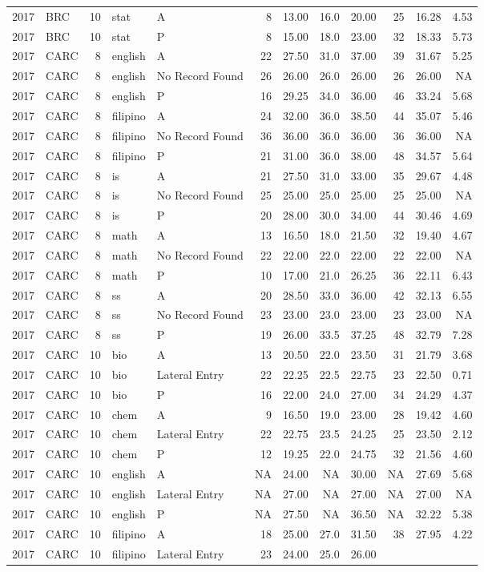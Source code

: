 \documentclass[]{article}
\begin{document}
\begin{longtable}[]{@{}rlrllrrrrrrr@{}}
2017 & BRC & 10 & stat & A & 8 & 13.00 & 16.0 & 20.00 & 25 & 16.28 &
4.53\tabularnewline
2017 & BRC & 10 & stat & P & 8 & 15.00 & 18.0 & 23.00 & 32 & 18.33 &
5.73\tabularnewline
2017 & CARC & 8 & english & A & 22 & 27.50 & 31.0 & 37.00 & 39 & 31.67 &
5.25\tabularnewline
2017 & CARC & 8 & english & No Record Found & 26 & 26.00 & 26.0 & 26.00
& 26 & 26.00 & NA\tabularnewline
2017 & CARC & 8 & english & P & 16 & 29.25 & 34.0 & 36.00 & 46 & 33.24 &
5.68\tabularnewline
2017 & CARC & 8 & filipino & A & 24 & 32.00 & 36.0 & 38.50 & 44 & 35.07
& 5.46\tabularnewline
2017 & CARC & 8 & filipino & No Record Found & 36 & 36.00 & 36.0 & 36.00
& 36 & 36.00 & NA\tabularnewline
2017 & CARC & 8 & filipino & P & 21 & 31.00 & 36.0 & 38.00 & 48 & 34.57
& 5.64\tabularnewline
2017 & CARC & 8 & is & A & 21 & 27.50 & 31.0 & 33.00 & 35 & 29.67 &
4.48\tabularnewline
2017 & CARC & 8 & is & No Record Found & 25 & 25.00 & 25.0 & 25.00 & 25
& 25.00 & NA\tabularnewline
2017 & CARC & 8 & is & P & 20 & 28.00 & 30.0 & 34.00 & 44 & 30.46 &
4.69\tabularnewline
2017 & CARC & 8 & math & A & 13 & 16.50 & 18.0 & 21.50 & 32 & 19.40 &
4.67\tabularnewline
2017 & CARC & 8 & math & No Record Found & 22 & 22.00 & 22.0 & 22.00 &
22 & 22.00 & NA\tabularnewline
2017 & CARC & 8 & math & P & 10 & 17.00 & 21.0 & 26.25 & 36 & 22.11 &
6.43\tabularnewline
2017 & CARC & 8 & ss & A & 20 & 28.50 & 33.0 & 36.00 & 42 & 32.13 &
6.55\tabularnewline
2017 & CARC & 8 & ss & No Record Found & 23 & 23.00 & 23.0 & 23.00 & 23
& 23.00 & NA\tabularnewline
2017 & CARC & 8 & ss & P & 19 & 26.00 & 33.5 & 37.25 & 48 & 32.79 &
7.28\tabularnewline
2017 & CARC & 10 & bio & A & 13 & 20.50 & 22.0 & 23.50 & 31 & 21.79 &
3.68\tabularnewline
2017 & CARC & 10 & bio & Lateral Entry & 22 & 22.25 & 22.5 & 22.75 & 23
& 22.50 & 0.71\tabularnewline
2017 & CARC & 10 & bio & P & 16 & 22.00 & 24.0 & 27.00 & 34 & 24.29 &
4.37\tabularnewline
2017 & CARC & 10 & chem & A & 9 & 16.50 & 19.0 & 23.00 & 28 & 19.42 &
4.60\tabularnewline
2017 & CARC & 10 & chem & Lateral Entry & 22 & 22.75 & 23.5 & 24.25 & 25
& 23.50 & 2.12\tabularnewline
2017 & CARC & 10 & chem & P & 12 & 19.25 & 22.0 & 24.75 & 32 & 21.56 &
4.60\tabularnewline
2017 & CARC & 10 & english & A & NA & 24.00 & NA & 30.00 & NA & 27.69 &
5.68\tabularnewline
2017 & CARC & 10 & english & Lateral Entry & NA & 27.00 & NA & 27.00 &
NA & 27.00 & NA\tabularnewline
2017 & CARC & 10 & english & P & NA & 27.50 & NA & 36.50 & NA & 32.22 &
5.38\tabularnewline
2017 & CARC & 10 & filipino & A & 18 & 25.00 & 27.0 & 31.50 & 38 & 27.95
& 4.22\tabularnewline
2017 & CARC & 10 & filipino & Lateral Entry & 23 & 24.00 & 25.0 & 26.00

\end{longtable}
\end{document}
